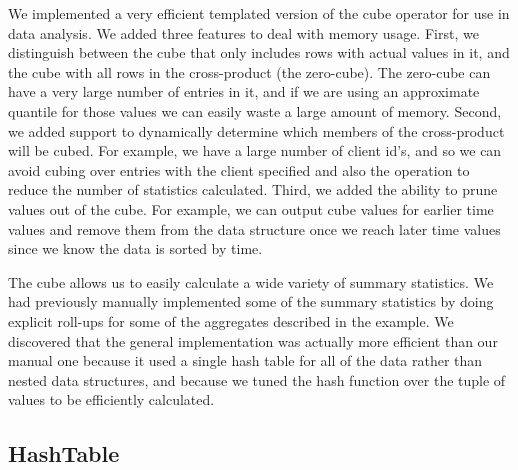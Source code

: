 We implemented a very efficient templated version of the cube operator
for use in data analysis.  We added three features to deal with memory
usage.  First, we distinguish between the cube that only includes rows
with actual values in it, and the cube with all rows in the
cross-product (the zero-cube).  The zero-cube can have a very large
number of entries in it, and if we are using an approximate quantile
for those values we can easily waste a large amount of memory.
Second, we added support to dynamically determine which members of the
cross-product will be cubed.  For example, we have a large number of
client id's, and so we can avoid cubing over entries with the client
specified and also the operation to reduce the number of statistics
calculated.  Third, we added the ability to prune values out of the
cube. For example, we can output cube values for earlier time values
and remove them from the data structure once we reach later time
values since we know the data is sorted by time.

The cube allows us to easily calculate a wide variety of summary
statistics.  We had previously manually implemented some of the
summary statistics by doing explicit roll-ups for some of the
aggregates described in the example.  We discovered that the general
implementation was actually more efficient than our manual one because
it used a single hash table for all of the data rather than nested
data structures, and because we tuned the hash function over the tuple
of values to be efficiently calculated.

\subsection{HashTable}

